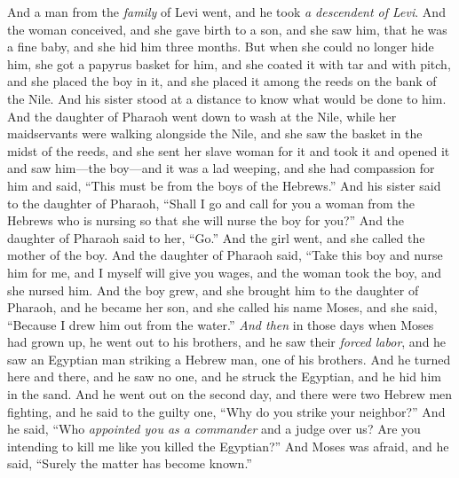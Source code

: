 \begin{biblechapter} %
 And a man from the \textit{family} of Levi went, and he took \textit{a descendent of Levi}.
\verse And the woman conceived, and she gave birth to a son, and she saw him, that he was a fine baby, and she hid him three months.
\verse But when she could no longer hide him, she got a papyrus basket for him, and she coated it with tar and with pitch, and she placed the boy in it, and she placed it among the reeds on the bank of the Nile.
\verse And his sister stood at a distance to know what would be done to him.
\verse And the daughter of Pharaoh went down to wash at the Nile, while her maidservants were walking alongside the Nile, and she saw the basket in the midst of the reeds, and she sent her slave woman for it and took it
\verse and opened it and saw him—the boy—and it was a lad weeping, and she had compassion for him and said, “This must be from the boys of the Hebrews.”
\verse And his sister said to the daughter of Pharaoh, “Shall I go and call for you a woman from the Hebrews who is nursing so that she will nurse the boy for you?”
\verse And the daughter of Pharaoh said to her, “Go.” And the girl went, and she called the mother of the boy.
\verse And the daughter of Pharaoh said, “Take this boy and nurse him for me, and I myself will give you wages, and the woman took the boy, and she nursed him.
\verse And the boy grew, and she brought him to the daughter of Pharaoh, and he became her son, and she called his name Moses, and she said, “Because I drew him out from the water.”
\verse \textit{And then} in those days when Moses had grown up, he went out to his brothers, and he saw their \textit{forced labor}, and he saw an Egyptian man striking a Hebrew man, one of his brothers.
\verse And he turned here and there, and he saw no one, and he struck the Egyptian, and he hid him in the sand.
\verse And he went out on the second day, and there were two Hebrew men fighting, and he said to the guilty one, “Why do you strike your neighbor?”
\verse And he said, “Who \textit{appointed you as a commander} and a judge over us? Are you intending to kill me like you killed the Egyptian?” And Moses was afraid, and he said, “Surely the matter has become known.”

\end{biblechapter}
